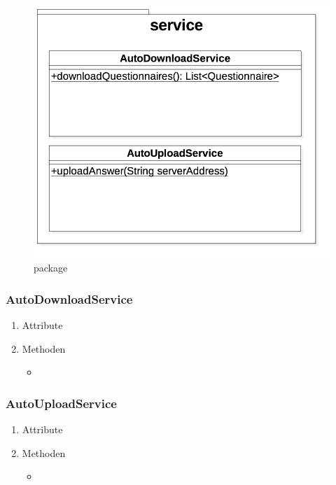 \documentclass[a4paper]{scrreprt}
\begin{document}
                \vspace*{0.5cm}
                \begin{figure}[H]
                    \centering
                    \includegraphics[scale = 0.5]{service.jpg}
                    \caption{package }
                \end{figure}

                \subsubsection{AutoDownloadService}
                    \begin{enumerate}
                        \item Attribute
                        \item Methoden
                            \begin{itemize}
                                \item {}
                            \end{itemize}
                    \end{enumerate}

                \subsubsection{AutoUploadService}
                    \begin{enumerate}
                        \item Attribute
                        \item Methoden
                            \begin{itemize}
                                \item {}
                            \end{itemize}
                    \end{enumerate}
\end{document}
